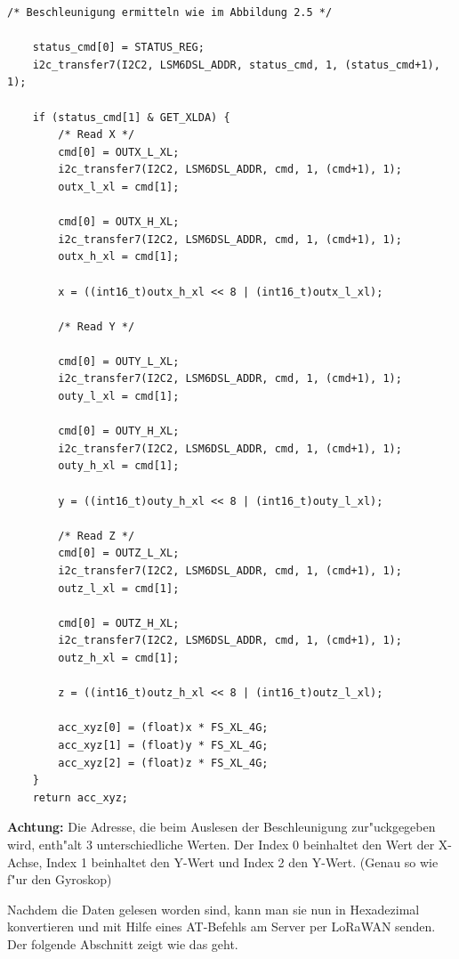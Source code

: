 \begin{lstlisting}[frame=single]
	/* Beschleunigung ermitteln wie im Abbildung 2.5 */
	
	status_cmd[0] = STATUS_REG;
	i2c_transfer7(I2C2, LSM6DSL_ADDR, status_cmd, 1, (status_cmd+1), 1);
	
	if (status_cmd[1] & GET_XLDA) {
		/* Read X */
		cmd[0] = OUTX_L_XL;
		i2c_transfer7(I2C2, LSM6DSL_ADDR, cmd, 1, (cmd+1), 1);
		outx_l_xl = cmd[1];
	
		cmd[0] = OUTX_H_XL;
		i2c_transfer7(I2C2, LSM6DSL_ADDR, cmd, 1, (cmd+1), 1);
		outx_h_xl = cmd[1];
	
		x = ((int16_t)outx_h_xl << 8 | (int16_t)outx_l_xl);
	
		/* Read Y */
	
		cmd[0] = OUTY_L_XL;
		i2c_transfer7(I2C2, LSM6DSL_ADDR, cmd, 1, (cmd+1), 1);
		outy_l_xl = cmd[1];
	
		cmd[0] = OUTY_H_XL;
		i2c_transfer7(I2C2, LSM6DSL_ADDR, cmd, 1, (cmd+1), 1);
		outy_h_xl = cmd[1];
	
		y = ((int16_t)outy_h_xl << 8 | (int16_t)outy_l_xl);
	
		/* Read Z */
		cmd[0] = OUTZ_L_XL;
		i2c_transfer7(I2C2, LSM6DSL_ADDR, cmd, 1, (cmd+1), 1);
		outz_l_xl = cmd[1];
	
		cmd[0] = OUTZ_H_XL;
		i2c_transfer7(I2C2, LSM6DSL_ADDR, cmd, 1, (cmd+1), 1);
		outz_h_xl = cmd[1];
	
		z = ((int16_t)outz_h_xl << 8 | (int16_t)outz_l_xl);
	
		acc_xyz[0] = (float)x * FS_XL_4G;
		acc_xyz[1] = (float)y * FS_XL_4G;
		acc_xyz[2] = (float)z * FS_XL_4G;
	}
	return acc_xyz;
\end{lstlisting}

\textbf{Achtung:} Die Adresse, die beim Auslesen der Beschleunigung
zur"uckgegeben wird, enth"alt 3 unterschiedliche Werten. Der Index 0 
beinhaltet den Wert der X-Achse, Index 1 beinhaltet den Y-Wert und 
Index 2 den Y-Wert. (Genau so wie f"ur den Gyroskop)

Nachdem die Daten gelesen worden sind, kann man sie nun in Hexadezimal 
konvertieren und mit Hilfe eines AT-Befehls am Server per LoRaWAN 
senden. Der folgende Abschnitt zeigt wie das geht.



